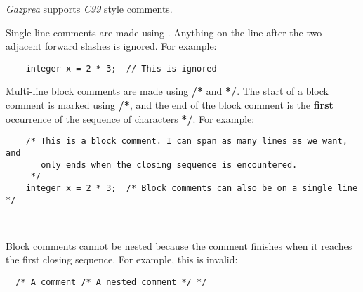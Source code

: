 \documentclass[../gazprea.tex]{subfiles}
\begin{document}
\textit{Gazprea} supports \textit{C99} style comments.

Single line comments are made using \code{//}. Anything on the line after the two adjacent forward
slashes is ignored. For example:
\begin{lstlisting}
	integer x = 2 * 3;  // This is ignored
\end{lstlisting}

Multi-line block comments are made using \textbf{/*} and \textbf{*/}. The start of a block comment
is marked using \textbf{/*}, and the end of the block comment is the \textbf{first} occurrence of
the sequence of characters \textbf{*/}. For example:
\begin{lstlisting}
	/* This is a block comment. I can span as many lines as we want, and
	   only ends when the closing sequence is encountered.
	 */
	integer x = 2 * 3;  /* Block comments can also be on a single line */
\end{lstlisting}

\\

Block comments cannot be nested because the comment finishes when it reaches the first closing
sequence. For example, this is invalid:
\begin{lstlisting}
  /* A comment /* A nested comment */ */
\end{lstlisting}
\end{document}
